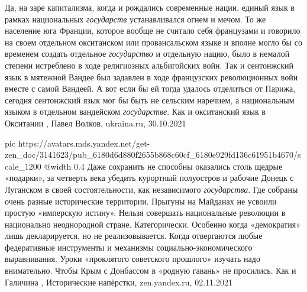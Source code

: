 Да, на заре капитализма, когда и рождались современные нации, единый язык в
рамках национальных \emph{государств} устанавливался огнем и мечом. То же
население юга Франции, которое вообще не считало себя французами и говорило на
своем отдельном окситанском или провансальском языке и вполне могло бы со
временем создать отдельное \emph{государство} и отдельную нацию, было в немалой
степени истреблено в ходе религиозных альбигойских войн.  Так и сентонжский
язык в мятежной Вандее был задавлен в ходе французских революционных войн
вместе с самой Вандеей. А вот если бы ей тогда удалось отделиться от Парижа,
сегодня сентонжский язык мог бы быть не сельским наречием, а национальным
языком в отдельном вандейском \emph{государстве}. Как и окситанский язык в
Окситании
, 
Павел Волков, ukraina.ru, 30.10.2021

\ifcmt
  pic https://avatars.mds.yandex.net/get-zen_doc/3141623/pub_6180d6d880f2655b868c60cf_6180e929fd136c61951b4670/scale_1200
  @width 0.4
\fi
Даже сохранить не способны оказались столь щедрые «подарки», за четверть века
убедить курортный полуостров и рабочие Донецк с Луганском в своей
состоятельности, как независимого \emph{государства}. Где собраны очень разные
исторические территории.  Прыгуны на Майданах не усвоили простую «имперскую
истину». Нельзя совершать национальные революции в национально неоднородной
стране. Категорически.  Особенно когда «демократия» лишь декларируется, но не
реализовывается.  Когда отвергаются любые федеративные инструменты и механизмы
социально-экономического выравнивания. Уроки «проклятого советского прошлого»
изучать надо внимательно. Чтобы Крым с Донбассом в «родную гавань» не
просились. Как и Галичина
, 
Исторические напёрстки, zen.yandex.ru, 02.11.2021

